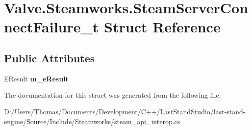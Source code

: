 \hypertarget{structValve_1_1Steamworks_1_1SteamServerConnectFailure__t}{}\section{Valve.\+Steamworks.\+Steam\+Server\+Connect\+Failure\+\_\+t Struct Reference}
\label{structValve_1_1Steamworks_1_1SteamServerConnectFailure__t}
\subsection*{Public Attributes}
\begin{DoxyCompactItemize}
\item 
\hypertarget{structValve_1_1Steamworks_1_1SteamServerConnectFailure__t_aff071b57bda4090c282087b44773b483}{}E\+Result {\bfseries m\+\_\+e\+Result}\label{structValve_1_1Steamworks_1_1SteamServerConnectFailure__t_aff071b57bda4090c282087b44773b483}

\end{DoxyCompactItemize}


The documentation for this struct was generated from the following file\+:\begin{DoxyCompactItemize}
\item 
D\+:/\+Users/\+Thomas/\+Documents/\+Development/\+C++/\+Last\+Stand\+Studio/last-\/stand-\/engine/\+Source/\+Include/\+Steamworks/steam\+\_\+api\+\_\+interop.\+cs\end{DoxyCompactItemize}
